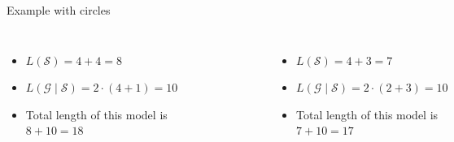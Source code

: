 \documentclass[10pt]{beamer}
\begin{document}
\begin{frame}{Example with circles}

    \begin{columns}[T, onlytextwidth]
            \begin{itemize}
                \item $L(\mathcal{S}) = 4 + 4 = 8$
                \item $L(\mathcal{G} \mid \mathcal{S}) = 2\cdot (4 + 1) = 10$
                \item Total length of this model is $8 + 10 = 18$
            \end{itemize}

        \begin{figure}
            \centering
            \includegraphics[scale=0.5]{figures/running-example/MDL/example-1.pdf}
        \end{figure}


            \begin{itemize}
                \item $L(\mathcal{S}) = 4 + 3 = 7$
                \item $L(\mathcal{G} \mid \mathcal{S}) = 2\cdot (2 + 3) = 10$
                \item Total length of this model is $7 + 10 = 17$
            \end{itemize}


\end{columns}
\end{frame}
\end{document}
